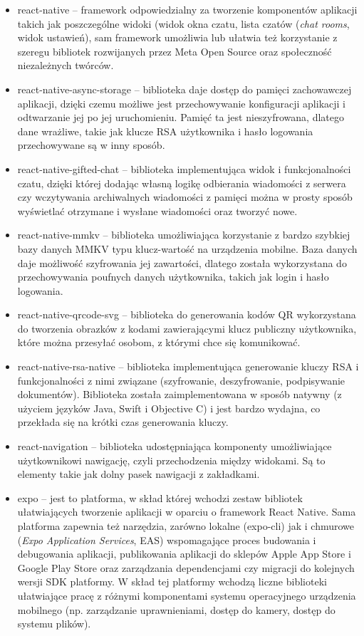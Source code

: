 \documentclass[../main.tex]{subfiles}
\begin{document}
\begin{itemize}
	\item react-native -- framework odpowiedzialny za tworzenie komponentów aplikacji takich jak poszczególne widoki (widok okna czatu, lista czatów (\textit{chat rooms}, widok ustawień), sam framework umożliwia lub ułatwia też korzystanie z szeregu bibliotek rozwijanych przez Meta Open Source\cite{meta_opensource} oraz społeczność niezależnych twórców.
	\item react-native-async-storage -- biblioteka daje dostęp do pamięci zachowawczej aplikacji, dzięki czemu możliwe jest przechowywanie konfiguracji aplikacji i odtwarzanie jej po jej uruchomieniu. Pamięć ta jest nieszyfrowana, dlatego dane wrażliwe, takie jak klucze RSA użytkownika i hasło logowania przechowywane są w inny sposób.
	\item react-native-gifted-chat -- biblioteka implementująca widok i funkcjonalności czatu, dzięki której dodając własną logikę odbierania wiadomości z serwera czy wczytywania archiwalnych wiadomości z pamięci można w prosty sposób wyświetlać otrzymane i wysłane wiadomości oraz tworzyć nowe.
	\item react-native-mmkv -- biblioteka umożliwiająca korzystanie z bardzo szybkiej bazy danych MMKV typu klucz-wartość na urządzenia mobilne. Baza danych daje możliwość szyfrowania jej zawartości, dlatego została wykorzystana do przechowywania poufnych danych użytkownika, takich jak login i hasło logowania.
	\item react-native-qrcode-svg -- biblioteka do generowania kodów QR wykorzystana do tworzenia obrazków z kodami zawierającymi klucz publiczny użytkownika, które można przesyłać osobom, z którymi chce się komunikować.
	\item react-native-rsa-native -- biblioteka implementująca generowanie kluczy RSA i funkcjonalności z nimi związane (szyfrowanie, deszyfrowanie, podpisywanie dokumentów). Biblioteka została zaimplementowana w sposób natywny (z użyciem języków Java, Swift i Objective C) i jest bardzo wydajna, co przekłada się na krótki czas generowania kluczy.
	\item react-navigation -- biblioteka udostępniająca komponenty umożliwiające użytkownikowi nawigację, czyli przechodzenia między widokami. Są to elementy takie jak dolny pasek nawigacji z zakładkami.
	\item expo -- jest to platforma, w skład której wchodzi zestaw bibliotek ułatwiających tworzenie aplikacji w oparciu o framework React Native. Sama platforma zapewnia też narzędzia, zarówno lokalne (expo-cli) jak i chmurowe (\textit{Expo Application Services}, EAS) wspomagające proces budowania i debugowania aplikacji, publikowania aplikacji do sklepów Apple App Store i Google Play Store oraz zarządzania dependencjami czy migracji do kolejnych wersji SDK platformy. W skład tej platformy wchodzą liczne biblioteki ułatwiające pracę z różnymi komponentami systemu operacyjnego urządzenia mobilnego (np. zarządzanie uprawnieniami, dostęp do kamery, dostęp do systemu plików).

\end{itemize}
\end{document}
